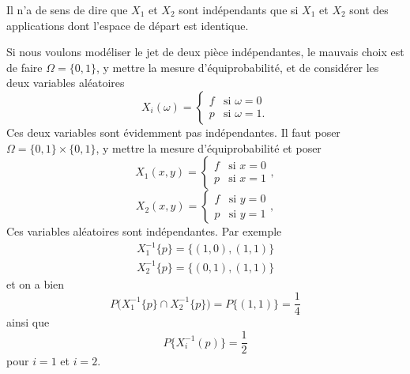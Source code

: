 \begin{remark}
	Il n'a de sens de dire que \( X_1\) et \( X_2\) sont indépendants que si \( X_1\) et \( X_2\) sont des applications dont l'espace de départ est identique.

	Si nous voulons modéliser le jet de deux pièce indépendantes, le mauvais choix est de faire \( \Omega=\{ 0,1 \}\), y mettre la mesure d'équiprobabilité, et de considérer les deux variables aléatoires
	\begin{equation}
		X_i(\omega)=\begin{cases}
			f & \text{si } \omega=0  \\
			p & \text{si } \omega=1.
		\end{cases}
	\end{equation}
	Ces deux variables sont évidemment pas indépendantes. Il faut poser \( \Omega=\{ 0,1 \}\times \{ 0,1 \}\), y mettre la mesure d'équiprobabilité et poser
	\begin{equation}
		X_1(x,y)=\begin{cases}
			f & \text{si } x=0 \\
			p & \text{si } x=1
		\end{cases},
	\end{equation}
	\begin{equation}
		X_2(x,y)=\begin{cases}
			f & \text{si } y=0 \\
			p & \text{si } y=1
		\end{cases},
	\end{equation}
	Ces variables aléatoires sont indépendantes. Par exemple
	\begin{subequations}
		\begin{align}
			X_1^{-1}\{ p \}=\{ (1,0),(1,1) \} \\
			X_2^{-1}\{ p \}=\{ (0,1),(1,1) \}
		\end{align}
	\end{subequations}
	et on a bien
	\begin{equation}
		P\big( X_1^{-1}\{ p \}\cap X_2^{-1}\{ p \} \big)=P\{ (1,1) \}=\frac{1}{ 4 }
	\end{equation}
	ainsi que
	\begin{equation}
		P\{ X_i^{-1}(p) \}=\frac{ 1 }{2}
	\end{equation}
	pour \( i=1\) et \( i=2\).
\end{remark}

